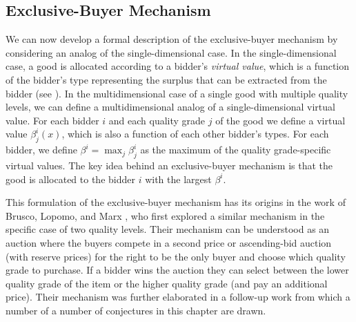 




\subsection{Exclusive-Buyer Mechanism}\label{subsec_ebm}

We can now develop a formal description of the exclusive-buyer mechanism by considering an analog of the single-dimensional case. In the single-dimensional case, a good is allocated according to a bidder's \textit{virtual value}, which is a function of the bidder's type representing the surplus that can be extracted from the bidder (see \cite{myerson1981optimal}). In the multidimensional case of a single good with multiple quality levels, we can define a multidimensional analog of a single-dimensional virtual value. For each bidder $i$ and each quality grade $j$ of the good we define a virtual value $\beta_j^i(x)$, which is also a function of each other bidder's types. For each bidder, we define $\beta^i = \max_j \beta_j^i$ as the maximum of the quality grade-specific virtual values. The key idea behind an exclusive-buyer mechanism is that the good is allocated to the bidder $i$ with the largest $\beta^i$.

This formulation of the exclusive-buyer mechanism has its origins in the work of Brusco, Lopomo, and Marx \autocite*{brusco2011}, who first explored a similar mechanism in the specific case of two quality levels. Their mechanism can be understood as an auction where the buyers compete in a second price or ascending-bid auction (with reserve prices) for the right to be the only buyer and choose which quality grade to purchase. If a bidder wins the auction they can select between the lower quality grade of the item or the higher quality grade (and pay an additional price). Their mechanism was further elaborated in a follow-up work \autocite{belloni2010multidimensional} from which a number of a number of conjectures in this chapter are drawn. 


